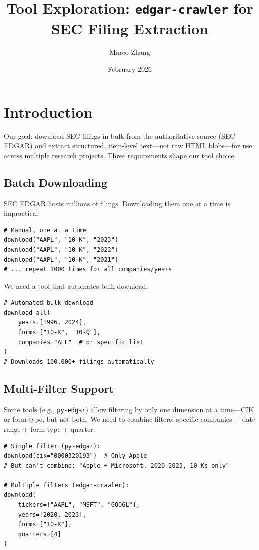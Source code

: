 \documentclass[11pt]{article}
\title{Tool Exploration: \texttt{edgar-crawler} for SEC Filing Extraction}
\author{Marco Zhang}
\date{February 2026}
\begin{document}
\maketitle

\section{Introduction}

Our goal: download SEC filings in bulk from the authoritative source (SEC EDGAR)
and extract structured, item-level text---not raw HTML blobs---for use across
multiple research projects. Three requirements shape our tool choice.

\subsection*{Batch Downloading}

SEC EDGAR hosts millions of filings. Downloading them one at a time is impractical:

\begin{lstlisting}
# Manual, one at a time
download("AAPL", "10-K", "2023")
download("AAPL", "10-K", "2022")
download("AAPL", "10-K", "2021")
# ... repeat 1000 times for all companies/years
\end{lstlisting}

We need a tool that automates bulk download:

\begin{lstlisting}
# Automated bulk download
download_all(
    years=[1996, 2024],
    forms=["10-K", "10-Q"],
    companies="ALL"  # or specific list
)
# Downloads 100,000+ filings automatically
\end{lstlisting}

\subsection*{Multi-Filter Support}

Some tools (e.g., \texttt{py-edgar}) allow filtering by only one dimension at a
time---CIK or form type, but not both. We need to combine filters: specific
companies + date range + form type + quarter:

\begin{lstlisting}
# Single filter (py-edgar):
download(cik="0000320193")  # Only Apple
# But can't combine: "Apple + Microsoft, 2020-2023, 10-Ks only"

# Multiple filters (edgar-crawler):
download(
    tickers=["AAPL", "MSFT", "GOOGL"],
    years=[2020, 2023],
    forms=["10-K"],
    quarters=[4]
)
\end{lstlisting}
\end{document}
